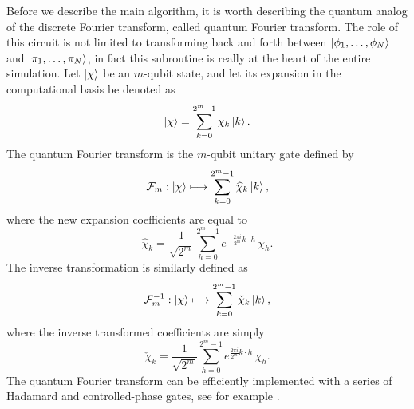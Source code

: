 \documentclass[a4paper,10pt]{report}
\begin{document}
Before we describe the main algorithm, it is worth describing the quantum analog of the discrete Fourier transform, called quantum Fourier transform. The role of this circuit is not limited to transforming back and forth between $\ket{\phi_1,\dots,\phi_N}$ and $\ket{\pi_1,\dots,\pi_N}$, in fact this subroutine is really at the heart of the entire simulation. Let $\ket{\chi}$ be an $m$-qubit state, and let its expansion in the computational basis be denoted as
\begin{equation}
\ket{\chi} = \sum_{k=0}^{2^m-1}\chi_k\ket{k}.
\end{equation}
The quantum Fourier transform is the $m$-qubit unitary gate defined by
\begin{align}
   \mathcal{F}_m: \ket{\chi} \longmapsto \sum_{k=0}^{2^m-1}\widehat{\chi}_k\ket{k},
\end{align}
where the new expansion coefficients are equal to
\begin{equation}
    \widehat{\chi}_k = \frac{1}{\sqrt{2^m}}\sum_{h=0}^{2^m-1} e^{-\frac{2\pi i}{2^m}k\cdot h}\,\chi_h.
\end{equation}
The inverse transformation is similarly defined as
\begin{align}
   \mathcal{F}^{-1}_m: \ket{\chi} \longmapsto \sum_{k=0}^{2^m-1}\check{\chi}_k\ket{k},
\end{align}
where the inverse transformed coefficients are simply
\begin{equation}
    \check{\chi}_k = \frac{1}{\sqrt{2^m}}\sum_{h=0}^{2^m-1} e^{\frac{2\pi i}{2^m}k\cdot h}\,\chi_h.
\end{equation}
The quantum Fourier transform can be efficiently implemented with a series of Hadamard and controlled-phase gates, see for example \cite{mosca98}. 
\end{document}
